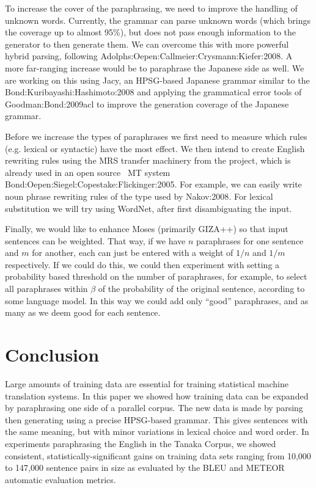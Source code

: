 \documentclass[english]{jnlp_1.4}
\newcommand{\citep}{}
\newcommand{\citet}{}
\newcommand{\erg}{}
\newcommand{\logonX}{}
\newcommand{\JE}{}
\begin{document}
To increase the cover of the paraphrasing, we need to improve the
handling of unknown words. Currently, the grammar can parse unknown
words (which brings the coverage up to almost 95\%), but does not pass
enough information to the generator to then generate them. We can
overcome this with more powerful hybrid parsing, following
\citet{Adolphs:Oepen:Callmeier:Crysmann:Kiefer:2008}. A more
far-ranging increase would be to paraphrase the Japanese side as
well. We are working on this using Jacy, an HPSG-based Japanese
grammar similar to the \erg \citep{Bond:Kuribayashi:Hashimoto:2008}
and applying the grammatical error tools of
\citet{Goodman:Bond:2009acl} to improve the generation coverage of the
Japanese grammar.

Before we increase the types of paraphrases we first need to measure
which rules (e.g. lexical or syntactic) have the most effect. We then
intend to create English rewriting rules using the MRS transfer
    machinery from the \logonX project, which is already used in an open
source \JE~MT system \citep{Bond:Oepen:Siegel:Copestake:Flickinger:2005}.
For example, we can easily write noun phrase rewriting rules of the
type used by \citet{Nakov:2008}. For lexical substitution we will try
using WordNet, after first disambiguating the input.

Finally, we would like to enhance Moses (primarily GIZA++) so that
input sentences can be weighted. That way, if we have $n$ paraphrases
for one sentence and $m$ for another, each can just be entered with a
weight of $1/n$ and $1/m$ respectively. If we could do this, we could
then experiment with setting a probability based threshold on the
number of paraphrases, for example, to select all paraphrases within
$\beta$ of the probability of the original sentence, according to some
language model. In this way we could add only ``good'' paraphrases,
and as many as we deem good for each sentence.



\section{Conclusion}

Large amounts of training data are essential for training statistical
machine translation systems. In this paper we showed how training data
can be expanded by paraphrasing one side of a parallel corpus. The new
data is made by parsing then generating using a precise HPSG-based
grammar. This gives sentences with the same meaning, but with minor
variations in lexical choice and word order.  In experiments
paraphrasing the English in the Tanaka Corpus, we showed consistent,
statistically-significant gains on training data sets ranging from
10,000 to 147,000 sentence pairs in size as evaluated by the BLEU and
METEOR automatic evaluation metrics.
\end{document}

